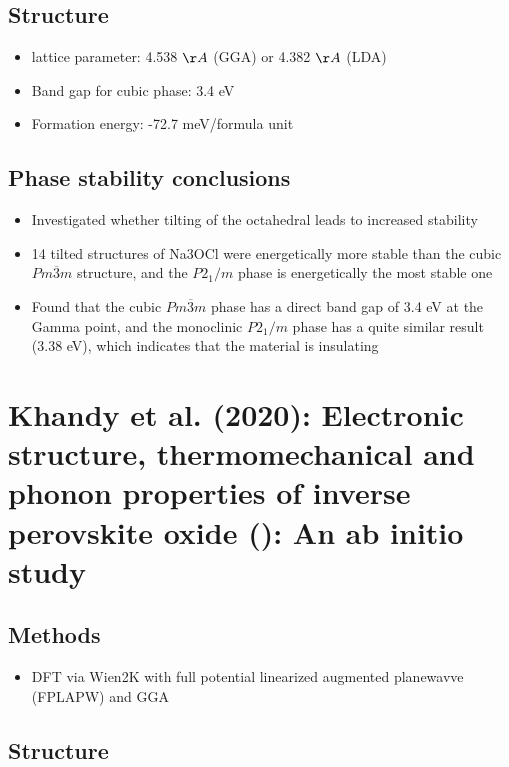 \documentclass[10pt,a4paper, titlepage]{article}
\begin{document}
\subsection{Structure}

\begin{itemize}
  \item {} lattice parameter: 4.538 $\AA$ (GGA) or 4.382 $\AA$ (LDA)
  \item Band gap for cubic phase: 3.4 eV
  \item Formation energy: -72.7 meV/formula unit
\end{itemize}

\subsection{Phase stability conclusions}

\begin{itemize}
  \item Investigated whether tilting of the  octahedral leads to increased stability
  \item 14 tilted structures of Na3OCl were energetically more stable than the cubic $Pm\overline{3}m$ structure, and the $P2_{1}/m$ phase is energetically the most stable one
  \item Found that the cubic $Pm\overline{3}m$ phase has a direct band gap of 3.4 eV at the Gamma point, and the monoclinic $P2_{1}/m$ phase has a quite similar result (3.38 eV), which indicates that the material is insulating
\end{itemize}

\section{Khandy et al. (2020): Electronic structure, thermomechanical and phonon properties of inverse perovskite oxide (): An ab initio study}

\subsection{Methods}

\begin{itemize}
  \item DFT via Wien2K with full potential linearized augmented planewavve (FPLAPW) and GGA
\end{itemize}

\subsection{Structure}
\end{document}
